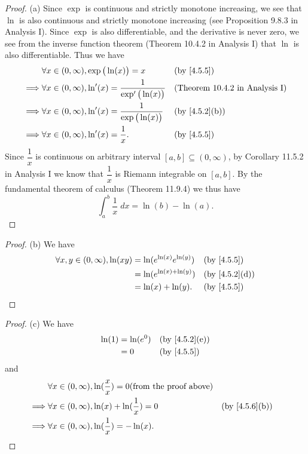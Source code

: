 \begin{proof}{(a)}
  Since \(\exp\) is continuous and strictly monotone increasing, we see that \(\ln\) is also continuous and strictly monotone increasing (see Proposition 9.8.3 in Analysis I).
  Since \(\exp\) is also differentiable, and the derivative is never zero, we see from the inverse function theorem (Theorem 10.4.2 in Analysis I) that \(\ln\) is also differentiable.
  Thus we have
  \begin{align*}
             & \forall x \in (0, \infty), \exp\big(\ln(x)\big) = x                   &  & \by{4.5.5}                            \\
    \implies & \forall x \in (0, \infty), \ln'(x) = \dfrac{1}{\exp'\big(\ln(x)\big)} &  & \text{(Theorem 10.4.2 in Analysis I)} \\
    \implies & \forall x \in (0, \infty), \ln'(x) = \dfrac{1}{\exp\big(\ln(x)\big)}  &  & \text{(by \cref{4.5.2}(b))}           \\
    \implies & \forall x \in (0, \infty), \ln'(x) = \dfrac{1}{x}.                    &  & \by{4.5.5}
  \end{align*}
  Since \(\dfrac{1}{x}\) is continuous on arbitrary interval \([a, b] \subseteq (0, \infty)\), by Corollary 11.5.2 in Analysis I we know that \(\dfrac{1}{x}\) is Riemann integrable on \([a, b]\).
  By the fundamental theorem of calculus (Theorem 11.9.4) we thus have
  \[
    \int_a^b \dfrac{1}{x} \; dx = \ln(b) - \ln(a).
  \]
\end{proof}

\begin{proof}{(b)}
  We have
  \begin{align*}
    \forall x, y \in (0, \infty), \ln(xy) & = \ln(e^{\ln(x)} e^{\ln(y)}) &  & \by{4.5.5}                  \\
                                          & = \ln(e^{\ln(x) + \ln(y)})   &  & \text{(by \cref{4.5.2}(d))} \\
                                          & = \ln(x) + \ln(y).           &  & \by{4.5.5}
  \end{align*}
\end{proof}

\begin{proof}{(c)}
  We have
  \begin{align*}
    \ln(1) & = \ln(e^0) &  & \text{(by \cref{4.5.2}(e))} \\
           & = 0        &  & \by{4.5.5}
  \end{align*}
  and
  \begin{align*}
             & \forall x \in (0, \infty), \ln(\dfrac{x}{x}) = 0 \text{(from the proof above)}                                  \\
    \implies & \forall x \in (0, \infty), \ln(x) + \ln(\dfrac{1}{x}) = 0                      &  & \text{(by \cref{4.5.6}(b))} \\
    \implies & \forall x \in (0, \infty), \ln(\dfrac{1}{x}) = -\ln(x).
  \end{align*}
\end{proof}

